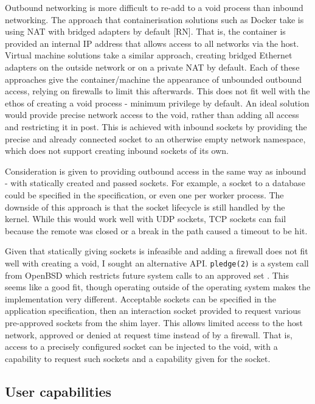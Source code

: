 \documentclass[sigplan]{acmart}
\begin{document}
Outbound networking is more difficult to re-add to a void process than inbound networking. The approach that containerisation solutions such as Docker take is using NAT with bridged adapters by default [RN]. That is, the container is provided an internal IP address that allows access to all networks via the host. Virtual machine solutions take a similar approach, creating bridged Ethernet adapters on the outside network or on a private NAT by default. Each of these approaches give the container/machine the appearance of unbounded outbound access, relying on firewalls to limit this afterwards. This does not fit well with the ethos of creating a void process - minimum privilege by default. An ideal solution would provide precise network access to the void, rather than adding all access and restricting it in post. This is achieved with inbound sockets by providing the precise and already connected socket to an otherwise empty network namespace, which does not support creating inbound sockets of its own.

Consideration is given to providing outbound access in the same way as inbound - with statically created and passed sockets. For example, a socket to a database could be specified in the specification, or even one per worker process. The downside of this approach is that the socket lifecycle is still handled by the kernel. While this would work well with UDP sockets, TCP sockets can fail because the remote was closed or a break in the path caused a timeout to be hit.

Given that statically giving sockets is infeasible and adding a firewall does not fit well with creating a void, I sought an alternative API. \texttt{pledge(2)} is a system call from OpenBSD which restricts future system calls to an approved set \citep{the_openbsd_foundation_pledge2_2022}. This seems like a good fit, though operating outside of the operating system makes the implementation very different. Acceptable sockets can be specified in the application specification, then an interaction socket provided to request various pre-approved sockets from the shim layer. This allows limited access to the host network, approved or denied at request time instead of by a firewall. That is, access to a precisely configured socket can be injected to the void, with a capability to request such sockets and a capability given for the socket.

\subsection{User capabilities}
\end{document}
